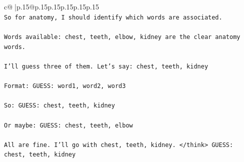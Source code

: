 \documentclass{article}
\begin{document}
{\begin{supertabular}{c@{$\;$}|p{.15\linewidth}@{}p{.15\linewidth}p{.15\linewidth}p{.15\linewidth}p{.15\linewidth}p{.15\linewidth}}
{{{\\ 
\texttt{So for anatomy, I should identify which words are associated.} \\
\\ 
\texttt{Words available: chest, teeth, elbow, kidney are the clear anatomy words.} \\
\\ 
\texttt{I'll guess three of them. Let's say: chest, teeth, kidney} \\
\\ 
\texttt{Format: GUESS: word1, word2, word3} \\
\\ 
\texttt{So: GUESS: chest, teeth, kidney} \\
\\ 
\texttt{Or maybe: GUESS: chest, teeth, elbow} \\
\\ 
\texttt{All are fine. I'll go with chest, teeth, kidney. </think> GUESS: chest, teeth, kidney} \\
            }
        }
    }
     \\ \\


\end{supertabular}}
\end{document}
